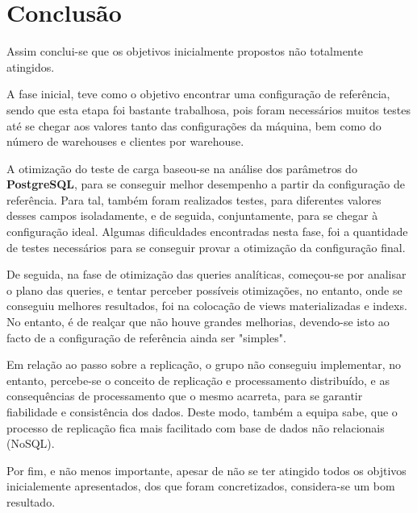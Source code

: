 \chapter{Conclusão} \label{chap:conc}

\hspace{5mm} Assim conclui-se que os objetivos inicialmente propostos não totalmente atingidos.

\hspace{5mm} A fase inicial, teve como o objetivo encontrar uma configuração de referência, sendo que esta etapa foi bastante trabalhosa, pois foram necessários muitos testes até se chegar aos valores tanto das configurações da máquina, bem como do número de warehouses e clientes por warehouse.

\hspace{5mm} A otimização do teste de carga baseou-se na análise dos parâmetros do \textbf{PostgreSQL}, para se conseguir melhor desempenho a partir da configuração de referência. Para tal, também foram realizados testes, para diferentes valores desses campos isoladamente, e de seguida, conjuntamente, para se chegar à configuração ideal.
Algumas dificuldades encontradas nesta fase, foi a quantidade de testes necessários para se conseguir provar a otimização da configuração final.


\hspace{5mm} De seguida, na fase de otimização das queries analíticas, começou-se por analisar o plano das queries, e tentar perceber possíveis otimizações, no entanto, onde se conseguiu melhores resultados, foi na colocação de views materializadas e indexs. No entanto, é de realçar que não houve grandes melhorias, devendo-se isto ao facto de a configuração de referência ainda ser "simples".

\hspace{5mm}Em relação ao passo sobre a replicação, o grupo não conseguiu implementar, no entanto, percebe-se o conceito de replicação e processamento distribuído, e as consequências de processamento que o mesmo acarreta, para se garantir fiabilidade e consistência dos dados. Deste modo, também a equipa sabe, que o processo de replicação fica mais facilitado com base de dados não relacionais (NoSQL).

\hspace{5mm} Por fim, e não menos importante, apesar de não se ter atingido todos os objtivos inicialemente apresentados, dos que foram concretizados, considera-se um bom resultado.